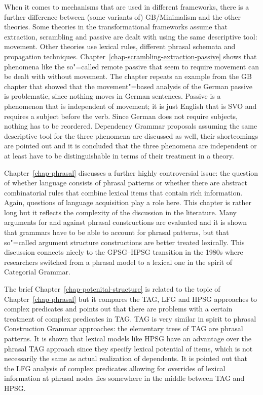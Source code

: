 When it comes to mechanisms that are used in different frameworks, there is a further difference
between (some variants of) GB/Minimalism and the other theories. Some theories in the
transformational frameworks assume that extraction, scrambling and passive are dealt with using the
same descriptive tool: movement. Other theories use lexical rules, different phrasal schemata and
\slasch propagation techniques. Chapter~\ref{chap-scrambling-extraction-passive} shows that
phenomena like the so"=called remote passive that seem to require movement can be dealt with without
movement. The chapter repeats an example from the GB chapter that showed that the movement"=based
analysis of the German passive is problematic, since nothing moves in German sentences. Passive is a
phenomenon that is independent of movement; it is just English that is SVO and requires a subject
before the verb. Since German does not require subjects, nothing has to be reordered. Dependency
Grammar proposals assuming the same descriptive tool for the three phenomena are discussed as well,
their shortcomings are pointed out and it is concluded that the three phenomena are independent
or at least have to be distinguishable in terms of their treatment in a theory.

Chapter~\ref{chap-phrasal} discusses a further highly controversial issue: the question of whether
language consists of phrasal patterns or whether there are abstract combinatorial rules that combine
lexical items that contain rich information. Again, questions of language acquisition play a role
here. This chapter is rather long but it reflects the complexity of the discussion in the
literature. Many arguments for and against phrasal constructions are evaluated and it is shown that
grammars have to be able to account for phrasal patterns, but that so"=called argument structure
constructions are better treated lexically. This discussion connects nicely to the GPSG--HPSG
transition in the 1980s where researchers switched from a phrasal model to a lexical one in the
spirit of Categorial Grammar.

The brief Chapter~\ref{chap-potenital-structure} is related to the topic of
Chapter~\ref{chap-phrasal} but it compares the TAG, LFG and HPSG approaches to complex predicates
and points out that there are problems with a certain treatment of complex predicates in TAG. TAG is
very similar in spirit to phrasal Construction Grammar approaches: the elementary trees of TAG are
phrasal patterns. It is shown that lexical models like HPSG have an advantage over the phrasal TAG approach
since they specify lexical potential of items, which is not necessarily the same as actual
realization of dependents. It is pointed out that the LFG analysis of complex predicates allowing
for overrides of lexical information at phrasal nodes lies somewhere in the middle between TAG and HPSG.

